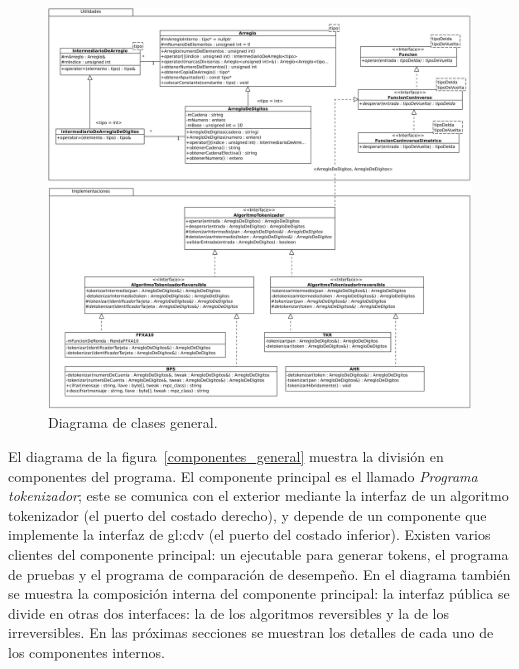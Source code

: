 \begin{figure}
  \begin{center}
    \includegraphics[width=1.0\linewidth]{diagramas/diagrama_general.png}
    \caption{Diagrama de clases general.}
    \label{clases_general}
  \end{center}
\end{figure}

El diagrama de la figura~\ref{componentes_general} muestra la división en
componentes del programa. El componente principal es el llamado
\textit{Programa tokenizador}; este se comunica con el exterior mediante la
interfaz de un algoritmo tokenizador (el puerto del costado derecho), y depende
de un componente que implemente la interfaz de \gls{gl:cdv} (el puerto del
costado inferior). Existen varios clientes del componente principal: un
ejecutable para generar tokens, el programa de pruebas y el programa de
comparación de desempeño. En el diagrama también se muestra la composición
interna del componente principal: la interfaz pública se divide en otras dos
interfaces: la de los algoritmos reversibles y la de los irreversibles. En las
próximas secciones se muestran los detalles de cada uno de los componentes
internos.


